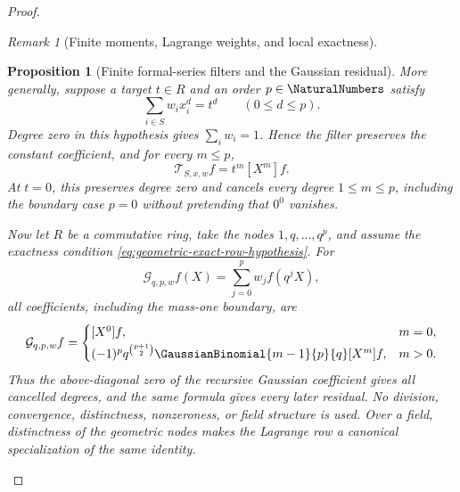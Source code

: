 \documentclass[11pt,oneside]{article}
\newtheorem{proposition}[theorem]{Proposition}
\theoremstyle{definition}
\theoremstyle{remark}
\newtheorem{remark}[theorem]{Remark}
\begin{document}
\begin{proof}
\begin{remark}[Finite moments, Lagrange weights, and local exactness]
\begin{proposition}[Finite formal-series filters and the Gaussian residual]
More generally, suppose a target \(t\in R\) and an order \(p\in\NaturalNumbers\) satisfy
\begin{equation}
 \sum_{i\in S}w_ix_i^d=t^d\qquad(0\le d\le p).            \label{eq:finite-series-filter-exact}
\end{equation}
Degree zero in this hypothesis gives \(\sum_iw_i=1\).  Hence the filter
preserves the constant coefficient, and for every \(m\le p\),
\begin{equation}
 [X^m]\mathcal T_{S,x,w}f=t^m[X^m]f.                      \label{eq:finite-series-filter-low}
\end{equation}
At \(t=0\), this preserves degree zero and cancels every degree
\(1\le m\le p\), including the boundary case \(p=0\) without pretending that
\(0^0\) vanishes.

Now let \(R\) be a commutative ring, take the nodes
\(1,q,\ldots,q^p\), and assume the exactness condition
\eqref{eq:geometric-exact-row-hypothesis}.  For
\begin{equation*}
 \mathcal G_{q,p,w}f(X)=\sum_{j=0}^{p}w_jf(q^jX),
\end{equation*}
all coefficients, including the mass-one boundary, are
\begin{equation}
 [X^m]\mathcal G_{q,p,w}f=
 \begin{cases}
  [X^0]f,&m=0,\\[2pt]
  (-1)^p q^{\binom{p+1}{2}}\GaussianBinomial{m-1}{p}{q}[X^m]f,&m>0.
 \end{cases}                                               \label{eq:geometric-series-filter-residual}
\end{equation}
Thus the above-diagonal zero of the recursive Gaussian coefficient gives all
cancelled degrees, and the same formula gives every later residual.  No
division, convergence, distinctness, nonzeroness, or field structure is used.
Over a field, distinctness of the geometric nodes makes the Lagrange row a
canonical specialization of the same identity.
\end{proposition}


\end{remark}
\end{proof}
\end{document}
